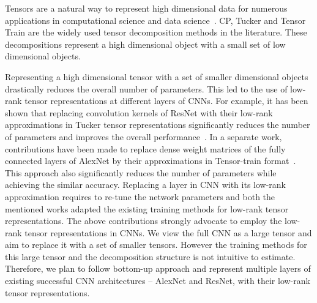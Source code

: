 Tensors are a natural way to represent high dimensional data for numerous applications in computational science and data science~\cite{KB-SIAMReview2009}. 
CP, Tucker and Tensor Train are the widely used tensor decomposition methods in the literature. These decompositions represent a high dimensional object with a small set of low dimensional objects.



Representing a high dimensional tensor with a set of smaller dimensional objects drastically reduces the overall number of parameters. This led to the use of low-rank tensor representations at different layers of CNNs. For example, it has been shown that replacing convolution kernels of ResNet with their low-rank approximations in Tucker tensor representations significantly reduces the number of parameters and improves the overall performance~\cite{PSSEG+-ECCV2020}. In a separate work, contributions have been made to replace dense weight matrices of the fully connected layers of AlexNet by their approximations in Tensor-train format~\cite{NPOV-NIPS2015}. This approach also significantly reduces the number of parameters while achieving the similar accuracy. Replacing a layer in CNN with its low-rank approximation requires to re-tune the network parameters and both the mentioned works adapted the existing training methods for low-rank tensor representations. The above contributions strongly advocate to employ the low-rank tensor representations in CNNs. We view the full CNN as a large tensor and aim to replace it with a set of smaller tensors. However the training methods for this large tensor and the decomposition structure is not intuitive to estimate. Therefore, we plan to follow bottom-up approach and represent multiple layers of existing successful CNN architectures -- AlexNet and ResNet, with their low-rank tensor representations.



